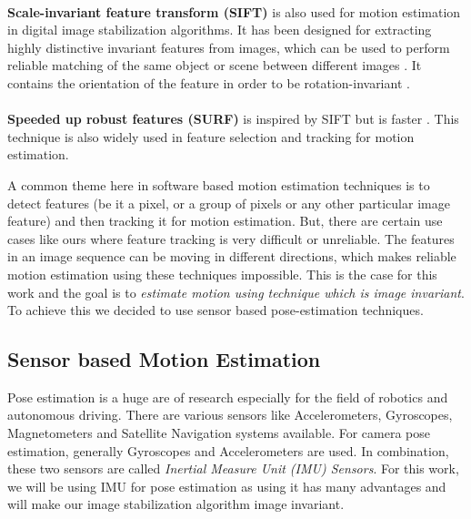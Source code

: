 \paragraph{}\textbf{Scale-invariant feature transform (SIFT)} is also used for motion estimation in digital image stabilization algorithms.  It has been designed for extracting highly distinctive invariant features from images, which can be used to perform reliable matching of the same object or scene between different images \citep{battiato2007sift}. It contains the orientation of the feature in order to be rotation-invariant \citep{dis_review}.

\paragraph{}\textbf{Speeded up robust features (SURF)} is inspired by SIFT but is faster \citep{dis_surf}. This technique is also widely used in feature selection and tracking for motion estimation.

A common theme here in software based motion estimation techniques is to detect features (be it a pixel, or a group of pixels or any other particular image feature) and then tracking it for motion estimation. But, there are certain use cases like ours where feature tracking is very difficult or unreliable. The features in an image sequence can be moving in different directions, which makes reliable motion estimation using these techniques impossible. This is the case for this work and the goal is to \textit{estimate motion using technique which is image invariant}. To achieve this we decided to use sensor based pose-estimation techniques.

\subsection{Sensor based Motion Estimation}
Pose estimation is a huge are of research especially for the field of robotics and autonomous driving. There are various sensors like Accelerometers, Gyroscopes, Magnetometers and Satellite Navigation systems available. For camera pose estimation, generally Gyroscopes and Accelerometers are used. In combination, these two sensors are called \textit{Inertial Measure Unit (IMU) Sensors}. For this work, we will be using IMU for pose estimation as using it has many advantages and will make our image stabilization algorithm image invariant.

